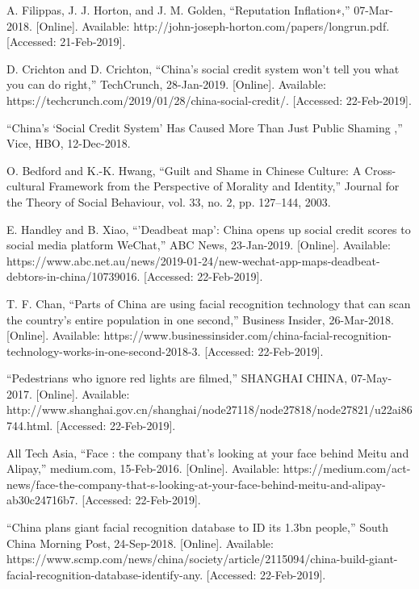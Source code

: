 \documentclass[letterpaper, 10 pt, conference]{ieeeconf}  %
\begin{document}
\begin{thebibliography}{99}
 A. Filippas, J. J. Horton, and J. M. Golden, “Reputation Inflation∗,” 07-Mar-2018. [Online]. Available: http://john-joseph-horton.com/papers/longrun.pdf. [Accessed: 21-Feb-2019].

 D. Crichton and D. Crichton, “China's social credit system won't tell you what you can do right,” TechCrunch, 28-Jan-2019. [Online]. Available: https://techcrunch.com/2019/01/28/china-social-credit/. [Accessed: 22-Feb-2019].

 “China’s ‘Social Credit System’ Has Caused More Than Just Public Shaming ,” Vice, HBO, 12-Dec-2018.


 O. Bedford and K.-K. Hwang, “Guilt and Shame in Chinese Culture: A Cross-cultural Framework from the Perspective of Morality and Identity,” Journal for the Theory of Social Behaviour, vol. 33, no. 2, pp. 127–144, 2003.

 E. Handley and B. Xiao, “'Deadbeat map': China opens up social credit scores to social media platform WeChat,” ABC News, 23-Jan-2019. [Online]. Available: https://www.abc.net.au/news/2019-01-24/new-wechat-app-maps-deadbeat-debtors-in-china/10739016. [Accessed: 22-Feb-2019].

 T. F. Chan, “Parts of China are using facial recognition technology that can scan the country's entire population in one second,” Business Insider, 26-Mar-2018. [Online]. Available: https://www.businessinsider.com/china-facial-recognition-technology-works-in-one-second-2018-3. [Accessed: 22-Feb-2019].

 “Pedestrians who ignore red lights are filmed,” SHANGHAI CHINA, 07-May-2017. [Online]. Available: http://www.shanghai.gov.cn/shanghai/node27118/node27818/node27821/u22ai86744.html. [Accessed: 22-Feb-2019].


 All Tech Asia, “Face : the company that's looking at your face behind Meitu and Alipay,” medium.com, 15-Feb-2016. [Online]. Available: https://medium.com/act-news/face-the-company-that-s-looking-at-your-face-behind-meitu-and-alipay-ab30c24716b7. [Accessed: 22-Feb-2019].


 “China plans giant facial recognition database to ID its 1.3bn people,” South China Morning Post, 24-Sep-2018. [Online]. Available: https://www.scmp.com/news/china/society/article/2115094/china-build-giant-facial-recognition-database-identify-any. [Accessed: 22-Feb-2019].


\end{thebibliography}
\end{document}
